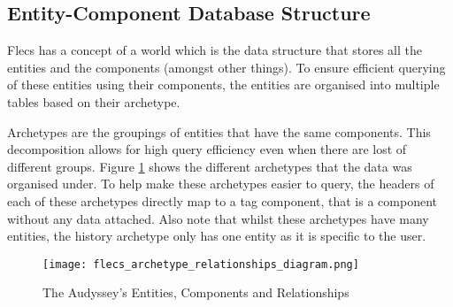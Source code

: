 \subsection{Entity-Component Database Structure}
Flecs has a concept of a world which is the data structure that stores all the entities and the components (amongst other things). To ensure efficient querying of these entities using their components, the entities are organised into multiple tables based on their archetype.

Archetypes are the groupings of entities that have the same components. This decomposition allows for high query efficiency even when there are lost of different groups. Figure \ref{figure::archetype_relationship} shows the different archetypes that the data was organised under. To help make these archetypes easier to query, the headers of each of these archetypes directly map to a tag component, that is a component without any data attached. Also note that whilst these archetypes have many entities, the history archetype only has one entity as it is specific to the user.

\begin{figure}
    \texttt{[image: flecs\_archetype\_relationships\_diagram.png]}
    \caption{The Audyssey's Entities, Components and Relationships}
    \label{figure::archetype_relationship}
\end{figure}

